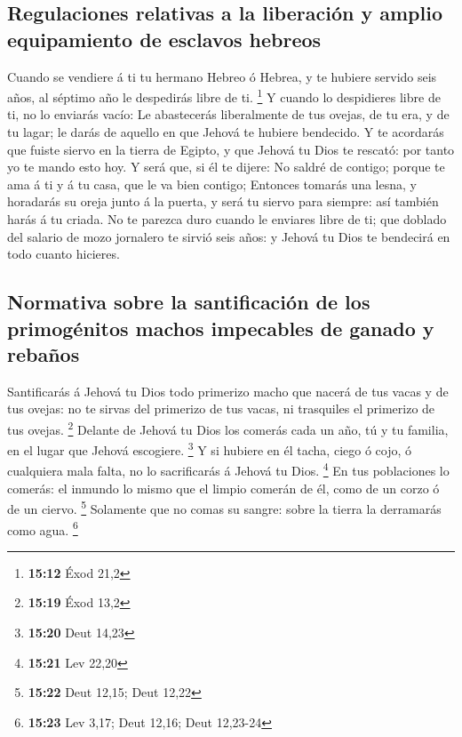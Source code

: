 \hypertarget{regulaciones-relativas-a-la-liberaciuxf3n-y-amplio-equipamiento-de-esclavos-hebreos}{%
\subsection{Regulaciones relativas a la liberación y amplio equipamiento
de esclavos
hebreos}\label{regulaciones-relativas-a-la-liberaciuxf3n-y-amplio-equipamiento-de-esclavos-hebreos}}

 Cuando se vendiere á ti tu hermano Hebreo ó Hebrea, y te
hubiere servido seis años, al séptimo año le despedirás libre de ti.
\footnote{\textbf{15:12} Éxod 21,2}  Y cuando lo
despidieres libre de ti, no lo enviarás vacío:  Le
abastecerás liberalmente de tus ovejas, de tu era, y de tu lagar; le
darás de aquello en que Jehová te hubiere bendecido.  Y
te acordarás que fuiste siervo en la tierra de Egipto, y que Jehová tu
Dios te rescató: por tanto yo te mando esto hoy.  Y será
que, si él te dijere: No saldré de contigo; porque te ama á ti y á tu
casa, que le va bien contigo;  Entonces tomarás una
lesna, y horadarás su oreja junto á la puerta, y será tu siervo para
siempre: así también harás á tu criada.  No te parezca
duro cuando le enviares libre de ti; que doblado del salario de mozo
jornalero te sirvió seis años: y Jehová tu Dios te bendecirá en todo
cuanto hicieres.

\hypertarget{normativa-sobre-la-santificaciuxf3n-de-los-primoguxe9nitos-machos-impecables-de-ganado-y-rebauxf1os}{%
\subsection{Normativa sobre la santificación de los primogénitos machos
impecables de ganado y
rebaños}\label{normativa-sobre-la-santificaciuxf3n-de-los-primoguxe9nitos-machos-impecables-de-ganado-y-rebauxf1os}}

 Santificarás á Jehová tu Dios todo primerizo macho que
nacerá de tus vacas y de tus ovejas: no te sirvas del primerizo de tus
vacas, ni trasquiles el primerizo de tus ovejas. \footnote{\textbf{15:19}
  Éxod 13,2}  Delante de Jehová tu Dios los comerás cada
un año, tú y tu familia, en el lugar que Jehová escogiere. \footnote{\textbf{15:20}
  Deut 14,23}  Y si hubiere en él tacha, ciego ó cojo, ó
cualquiera mala falta, no lo sacrificarás á Jehová tu Dios. \footnote{\textbf{15:21}
  Lev 22,20}  En tus poblaciones lo comerás: el inmundo
lo mismo que el limpio comerán de él, como de un corzo ó de un ciervo.
\footnote{\textbf{15:22} Deut 12,15; Deut 12,22} 
Solamente que no comas su sangre: sobre la tierra la derramarás como
agua. \footnote{\textbf{15:23} Lev 3,17; Deut 12,16; Deut 12,23-24}


